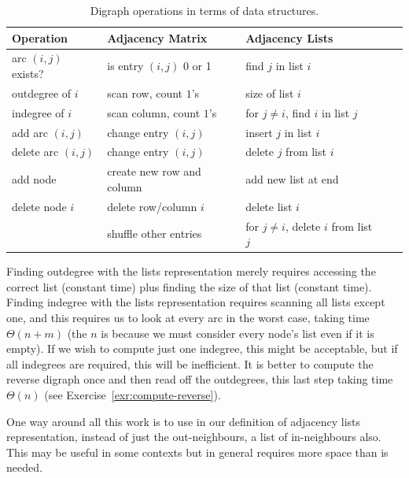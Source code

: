 \begin{table}
\caption{Digraph operations in terms of data structures.}
\label{table:graphadt}

\begin{center}
\begin{tabular}{|l|l|l|l|l|}
\hline

\textbf{Operation} & \textbf{Adjacency Matrix} & \textbf{Adjacency Lists} \\
\hline

arc $(i, j)$ exists? & is entry $(i,j)$ 0 or 1  & find $j$ in  list $i$ \\
\hline
outdegree  of $i$ & scan row, count $1$'s & size of  list  $i$\\
\hline
indegree of $i$ & scan column,  count $1$'s & for $j\neq i$, find $i$ in list $j$ \\
\hline
add arc $(i, j)$ & change entry $(i ,j)$ & insert $j$ in list $i$ \\
\hline
delete arc $(i, j)$ & change entry $(i ,j)$ & delete $j$ from list $i$ \\
\hline
add node & create new row and column & add new list at end\\
\hline
delete node $i$ & delete row/column $i$  & delete list $i$ \\
& shuffle other entries & for $j\neq i$, delete  $i$ from list $j$ \\ 
\hline

\end{tabular}
\end{center}
\end{table}



Finding outdegree with the lists representation merely requires accessing
the correct list (constant time) plus finding the size of  that list
(constant time). Finding indegree with the  lists representation requires
scanning all lists except one, and this requires us to look at every arc in
the worst case, taking time $\Theta(n+m)$ (the $n$ is because we must
consider every node's list even if it is empty). If we wish to compute just
one indegree, this might be acceptable, but if all indegrees are required,
this will be inefficient. It is better to compute the reverse digraph once
and then read off the outdegrees, this last step taking time $\Theta(n)$ 
(see Exercise~\ref{exr:compute-reverse}).

One way around all this work is to use in
our definition of adjacency lists representation, instead of just the
out-neighbours, a list of in-neighbours also. This may be useful in some
contexts but in general requires more space than is needed.

